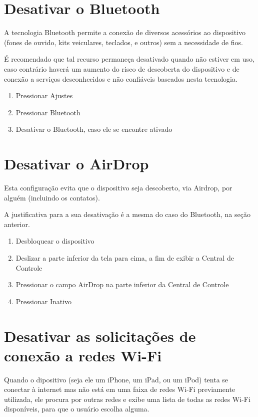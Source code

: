 \section{Desativar o Bluetooth}

A tecnologia Bluetooth permite a conex\~ao de diversos acess\'orios ao dispositivo (fones de ouvido, kits veiculares, teclados, e outros) sem a necessidade de fios. 

\'E recomendado que tal recurso permane\c ca desativado quando n\~ao estiver em uso, caso contr\'ario haver\'a um aumento do risco de descoberta do dispositivo e de conex\~ao a servi\c cos desconhecidos e n\~ao confi\'aveis baseados nesta tecnologia.

\begin{enumerate}
\item Pressionar Ajustes
\item Pressionar Bluetooth
\item Desativar o Bluetooth, caso ele se encontre ativado
\end{enumerate}

\section{Desativar o AirDrop}

Esta configura\c c\~ao evita que o dispositivo seja descoberto, via Airdrop, por algu\'em (incluindo os contatos). 

A justificativa para a sua desativa\c c\~ao \'e a mesma do caso do Bluetooth, na se\c c\~ao anterior.

\begin{enumerate}
\item Desbloquear o dispositivo
\item Deslizar a parte inferior da tela para cima, a fim de exibir a Central de Controle
\item Pressionar o campo AirDrop na parte inferior da Central de Controle
\item Pressionar Inativo 
\end{enumerate}

\section{Desativar as solicita\c c\~oes de conex\~ao a redes Wi-Fi}

Quando o dipositivo (seja ele um iPhone, um iPad, ou um iPod) tenta se conectar \`a internet mas n\~ao est\'a em uma faixa de redes Wi-Fi previamente utilizada, ele procura por outras redes e exibe uma lista de todas as redes Wi-Fi dispon\'iveis, para que o usu\'ario escolha alguma.

